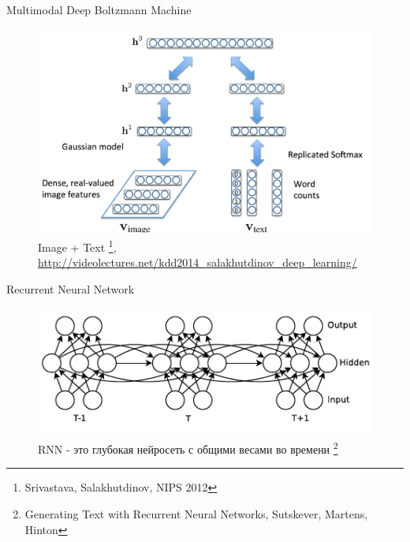 \documentclass[10pt]{beamer}
\begin{document}
\begin{frame}{Multimodal Deep Boltzmann Machine}

\begin{figure}[h!]
  \centering
  \includegraphics[width=1\textwidth]{images/mmdbm.png}
  \caption{Image + Text \footnote{Srivastava, Salakhutdinov, NIPS 2012},\\ \url{http://videolectures.net/kdd2014_salakhutdinov_deep_learning/}}
\end{figure}

\end{frame}


\begin{frame}{Recurrent Neural Network}

\begin{figure}[h!]
  \centering
  \includegraphics[width=1\textwidth]{images/rnn.png}
  \caption{RNN - это глубокая нейросеть с общими весами во времени \footnote{Generating Text with Recurrent Neural Networks, Sutskever, Martens, Hinton}}
\end{figure}

\end{frame}
\end{document}
